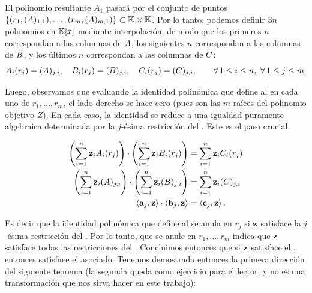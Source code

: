 El polinomio resultante $A_1$ pasará por el conjunto de puntos $\{(r_1, (A)_{1,1}), \ldots, (r_m, (A)_{m,1})\} \subset \mathbb{K} \times \mathbb{K}$. Por lo tanto, podemos definir $3n$ polinomios en $\mathbb{K}[x]$ mediante interpolación, de modo que los primeros $n$ correspondan a las columnas de $A$, los siguientes $n$ correspondan a las columnas de $B$, y los últimos $n$ correspondan a las columnas de $C$:
$$A_i(r_j) = (A)_{j,i}, \quad B_i(r_j) = (B)_{j,i}, \quad C_i(r_j) = (C)_{j,i}, \qquad \forall\, 1 \leq i \leq n,\ \forall\, 1 \leq j \leq m.$$

Luego, observamos que evaluando la identidad polinómica que define al \QAP en cada uno de $r_1, \ldots, r_m$, el lado derecho se hace cero (pues son las $m$ raíces del polinomio objetivo $Z$). En cada caso, la identidad se reduce a una igualdad puramente algebraica determinada por la $j$-ésima restricción del \ROneCS. Este es el paso crucial.

$$\begin{aligned}
	\left(\sum_{i=1}^{n} \mathbf{z}_i A_i(r_j)\right) \cdot \left(\sum_{i=1}^{n} \mathbf{z}_i B_i(r_j)\right) &= \sum_{i=1}^{n} \mathbf{z}_i C_i(r_j) \\
		\left(\sum_{i=1}^{n} \mathbf{z}_i (A)_{j,i} \right) \cdot \left(\sum_{i=1}^{n} \mathbf{z}_i (B)_{j,i} \right) &= \sum_{i=1}^{n} \mathbf{z}_i (C)_{j,i} \\
		\left\langle \mathbf{a}_j, \mathbf{z} \right\rangle \cdot \left\langle \mathbf{b}_j, \mathbf{z} \right\rangle &= \left\langle \mathbf{c}_j, \mathbf{z} \right\rangle.\\
\end{aligned}$$

Es decir que la identidad polinómica que define al \QAP se anula en $r_j$ si $\mathbf{z}$ satisface la $j$-ésima restricción del \ROneCS. Por lo tanto, que se anule en $r_1, \ldots, r_m$ indica que $\mathbf{z}$ satisface todas las restricciones del \ROneCS. Concluimos entonces que si $\mathbf{z}$ satisface el \ROneCS, entonces satisface el \QAP asociado. Tenemos demostrada entonces la primera dirección del siguiente teorema (la segunda queda como ejercicio para el lector, y no es una transformación que nos sirva hacer en este trabajo):

